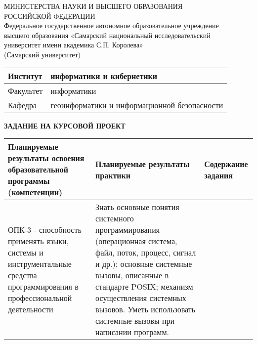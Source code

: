 \documentclass[a4paper,14pt,oneside]{extreport}  %
\begin{document}
	\begin{titlepage}
		\begin{centering}
		{ МИНИСТЕРСТВА НАУКИ И ВЫСШЕГО ОБРАЗОВАНИЯ \\ РОССИЙСКОЙ ФЕДЕРАЦИИ\\Федеральное государственное автономное образовательное учреждение\\
			высшего образования «Самарский национальный исследовательский\\
			университет имени академика С.П. Королева»\\{(Самарский университет)}\\	}
      	\end{centering}
        \vfill
        \begin{table}[h]
            \begin{center}
         	\begin{tabular}{|p{}|p{}|}
       		\hline Институт & информатики и кибернетики \\ \hline
       		Факультет & информатики  \\ \hline
       		Кафедра & геоинформатики и информационной безопасности \\ \hline
        	\end{tabular}
            \end{center}
        \end{table}
		\centerline{\bf ЗАДАНИЕ НА КУРСОВОЙ ПРОЕКТ} 
		\vfill
        \vfill
        \begin{table}[h]
          \begin{center}
          	\begin{tabular}{|p{}|p{6cm}|p{6cm}|}
          		\hline  
          		Планируемые результаты освоения образовательной программы (компетенции) & Планируемые результаты практики & Содержание задания \\ \hline
          		ОПК-3 ‑ способность применять языки, системы и инструментальные средства программирования в профессиональной деятельности& Знать основные понятия системного программирования (операционная система, файл, поток, процесс, сигнал и др.); основные системные вызовы, описанные в стандарте POSIX; механизм осуществления системных вызовов.
          		Уметь использовать системные вызовы при написании программ.

\end{tabular}
\end{center}
\end{table}
\end{titlepage}
\end{document}
